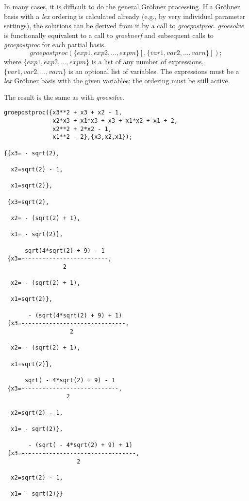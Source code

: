 In many cases, it is difficult to do the general Gr\"obner processing.
If a Gr\"obner basis with a {\it lex} ordering is calculated already (e.g.,
by very individual parameter settings), the solutions can be derived
from it by a call to \emph{groepostproc}. \emph{groesolve} is functionally
equivalent to a call to \emph{groebnerf} and subsequent calls to
\emph{groepostproc} for each partial basis.
\[
 groepostproc(\{exp1, exp2, \ldots , expm\}[,\{var1, var2, \ldots ,
varn\}]);
\]
where $\{exp1, exp2, \ldots , expm\}$ is a list of any number of
expressions, \linebreak[4] $\{var1, var2, \ldots, varn\}$ is an
optional list of variables. The expressions must be a {\it lex} Gr\"obner
basis with the given variables; the ordering must be still active.

The result is the same as with \emph{groesolve}.

\begin{verbatim}
groepostproc({x3**2 + x3 + x2 - 1,
              x2*x3 + x1*x3 + x3 + x1*x2 + x1 + 2,
              x2**2 + 2*x2 - 1,
              x1**2 - 2},{x3,x2,x1});

{{x3= - sqrt(2),

  x2=sqrt(2) - 1,

  x1=sqrt(2)},

 {x3=sqrt(2),

  x2= - (sqrt(2) + 1),

  x1= - sqrt(2)},

      sqrt(4*sqrt(2) + 9) - 1
 {x3=-------------------------,
                 2

  x2= - (sqrt(2) + 1),

  x1=sqrt(2)},

       - (sqrt(4*sqrt(2) + 9) + 1)
 {x3=------------------------------,
                   2

  x2= - (sqrt(2) + 1),

  x1=sqrt(2)},

      sqrt( - 4*sqrt(2) + 9) - 1
 {x3=----------------------------,
                  2

  x2=sqrt(2) - 1,

  x1= - sqrt(2)},

       - (sqrt( - 4*sqrt(2) + 9) + 1)
 {x3=---------------------------------,
                     2

  x2=sqrt(2) - 1,

  x1= - sqrt(2)}}
\end{verbatim}

